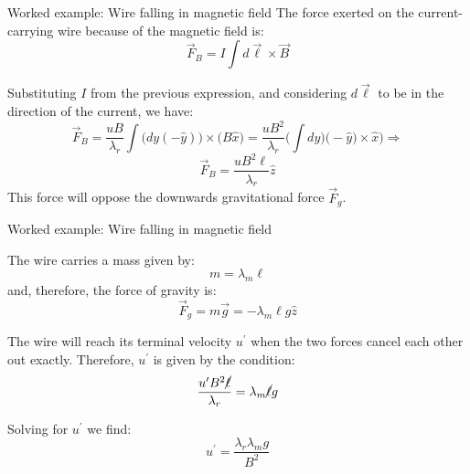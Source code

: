 {\begin{frame}{Worked example: Wire falling in magnetic field}
  The force exerted on the current-carrying wire because of the
  magnetic field is:
  \begin{equation*}
    \vec{F}_{B} =
     I \int d\vec{\ell} \times \vec{B}
  \end{equation*}

  Substituting $I$ from the previous expression, and considering
  $d\vec{\ell}$ to be in the direction of the current, we have:
  \begin{equation*}
    \vec{F}_{B} =
     \frac{uB}{\lambda_{r}} \int \Big( dy(-\hat{y})\Big) \times \Big( B \hat{x}\Big) =
     \frac{uB^2}{\lambda_{r}} \Big(\int dy \Big) \Big(- \hat{y}) \times \hat{x}\Big) \Rightarrow
  \end{equation*}
  \begin{equation*}
    \vec{F}_{B} =
     \frac{uB^2\ell}{\lambda_{r}} \hat{z}
  \end{equation*}
  This force will oppose the downwards gravitational force $\vec{F}_{g}$.

\end{frame}

%
%
%

\begin{frame}{Worked example: Wire falling in magnetic field}

  The wire carries a mass given by:
  \begin{equation*}
     m = \lambda_{m} \ell
  \end{equation*}
  and, therefore, the force of gravity is:
  \begin{equation*}
     \vec{F}_{g} = m \vec{g} = - \lambda_{m} \ell g \hat{z}
  \end{equation*}

  The wire will reach its terminal velocity $u^{\prime}$ when the
  two forces cancel each other out exactly.
  Therefore, $u^{\prime}$ is given by the condition:
  \begin{equation*}
     \frac{u^{\prime} B^2 \cancel{\ell}}{\lambda_{r}} = \lambda_{m} \cancel{\ell} g
  \end{equation*}

  Solving for $u^{\prime}$ we find:
  \begin{equation*}
     u^{\prime} = \frac{\lambda_{r} \lambda_{m} g}{B^2}
  \end{equation*}

\end{frame}

} %


